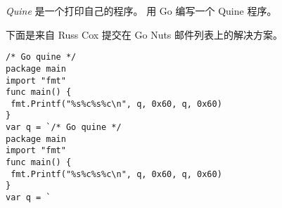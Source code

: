 \begin{Exercise}[title={Quine},difficulty=2]
\emph{Quine} 是一个打印自己的程序。
\label{ex:quine}
\Question\label{ex:quine q1} 用 Go 编写一个 Quine 程序。
\end{Exercise}

\begin{Answer}
\begin{lbar}
下面是来自 Russ Cox 提交在 Go Nuts 邮件列表上的解决方案。
\end{lbar}
\Question
\begin{lstlisting}[caption=一个 Go quine]
/* Go quine */
package main
import "fmt"
func main() {
 fmt.Printf("%s%c%s%c\n", q, 0x60, q, 0x60)
}
var q = `/* Go quine */
package main
import "fmt"
func main() {
 fmt.Printf("%s%c%s%c\n", q, 0x60, q, 0x60)
}
var q = `
\end{lstlisting}
\end{Answer}
